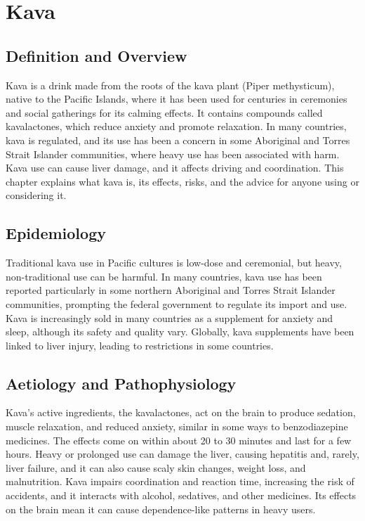 \chapter{Kava}

\section*{Definition and Overview}
Kava is a drink made from the roots of the kava plant (Piper methysticum), native to the Pacific Islands, where it has been used for centuries in ceremonies and social gatherings for its calming effects. It contains compounds called kavalactones, which reduce anxiety and promote relaxation. In many countries, kava is regulated, and its use has been a concern in some Aboriginal and Torres Strait Islander communities, where heavy use has been associated with harm. Kava use can cause liver damage, and it affects driving and coordination. This chapter explains what kava is, its effects, risks, and the advice for anyone using or considering it.

\section*{Epidemiology}
Traditional kava use in Pacific cultures is low-dose and ceremonial, but heavy, non-traditional use can be harmful. In many countries, kava use has been reported particularly in some northern Aboriginal and Torres Strait Islander communities, prompting the federal government to regulate its import and use. Kava is increasingly sold in many countries as a supplement for anxiety and sleep, although its safety and quality vary. Globally, kava supplements have been linked to liver injury, leading to restrictions in some countries.

\section*{Aetiology and Pathophysiology}
Kava's active ingredients, the kavalactones, act on the brain to produce sedation, muscle relaxation, and reduced anxiety, similar in some ways to benzodiazepine medicines. The effects come on within about 20 to 30 minutes and last for a few hours. Heavy or prolonged use can damage the liver, causing hepatitis and, rarely, liver failure, and it can also cause scaly skin changes, weight loss, and malnutrition. Kava impairs coordination and reaction time, increasing the risk of accidents, and it interacts with alcohol, sedatives, and other medicines. Its effects on the brain mean it can cause dependence-like patterns in heavy users.

